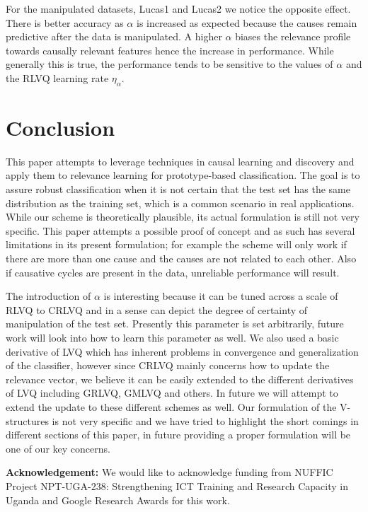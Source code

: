 \documentclass{esannV2}
\begin{document}
For the manipulated datasets, Lucas1 and Lucas2 we notice the opposite effect. There is better accuracy as $\alpha$ is increased as expected because the causes remain predictive after the data is manipulated. A higher $\alpha$ biases the relevance profile towards causally relevant features hence the increase in performance. While generally this is true, the performance tends to be sensitive to the values of $\alpha$ and the RLVQ learning rate $\eta_\alpha$.

\section{Conclusion}
\label{sec:Conclusion}

This paper attempts to leverage techniques in causal learning and discovery and apply them to relevance learning for prototype-based classification. The goal is to assure robust classification when it is not certain that the test set has the same distribution as the training set, which is a common scenario in real applications. While our scheme is theoretically plausible, its actual formulation is still not very specific. This paper attempts a possible proof of concept and as such has several limitations in its present formulation; for example the scheme will only work if there are more than one cause and the causes are not related to each other. Also if causative cycles are present in the data, unreliable performance will result. 

The introduction of $\alpha$ is interesting because it can be tuned across a scale of RLVQ to CRLVQ and in a sense can depict the degree of certainty of manipulation of the test set. Presently this parameter is set arbitrarily, future work will look into how to learn this parameter as well. We also used a basic derivative of LVQ which has inherent problems in convergence and generalization of the classifier, however since CRLVQ mainly concerns how to update the relevance vector, we believe it can be easily extended to the different derivatives of LVQ including GRLVQ\cite{10}, GMLVQ\cite{09} and others. In future we will attempt to extend the update to these different schemes as well. Our formulation of the V-structures is not very specific and we have tried to highlight the short comings in different sections of this paper, in future providing a proper formulation will be one of our key concerns.

\textbf{Acknowledgement:} We would like to acknowledge funding from NUFFIC Project NPT-UGA-238: Strengthening ICT Training and Research Capacity in Uganda and Google Research Awards for this work.

\begin{footnotesize}




\end{footnotesize}

\end{document}
